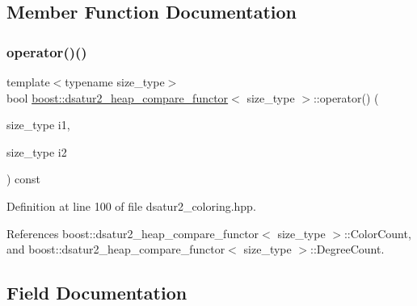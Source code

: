 \subsection{Member Function Documentation}
\mbox{\label{structboost_1_1dsatur2__heap__compare__functor_acecfc25425e13e3ab5fe04aeb906e59f}} 
\subsubsection{\texorpdfstring{operator()()}{operator()()}}
{\footnotesize\ttfamily template$<$typename size\+\_\+type$>$ \\
bool \hyperlink{structboost_1_1dsatur2__heap__compare__functor}{boost\+::dsatur2\+\_\+heap\+\_\+compare\+\_\+functor}$<$ size\+\_\+type $>$\+::operator() (\begin{DoxyParamCaption}\item[{size\+\_\+type}]{i1,  }\item[{size\+\_\+type}]{i2 }\end{DoxyParamCaption}) const\hspace{0.3cm}{\ttfamily [inline]}}



Definition at line 100 of file dsatur2\+\_\+coloring.\+hpp.



References boost\+::dsatur2\+\_\+heap\+\_\+compare\+\_\+functor$<$ size\+\_\+type $>$\+::\+Color\+Count, and boost\+::dsatur2\+\_\+heap\+\_\+compare\+\_\+functor$<$ size\+\_\+type $>$\+::\+Degree\+Count.



\subsection{Field Documentation}
\mbox{\label{structboost_1_1dsatur2__heap__compare__functor_a34f5528166c896b4121a8f9ac52c378a}} 
